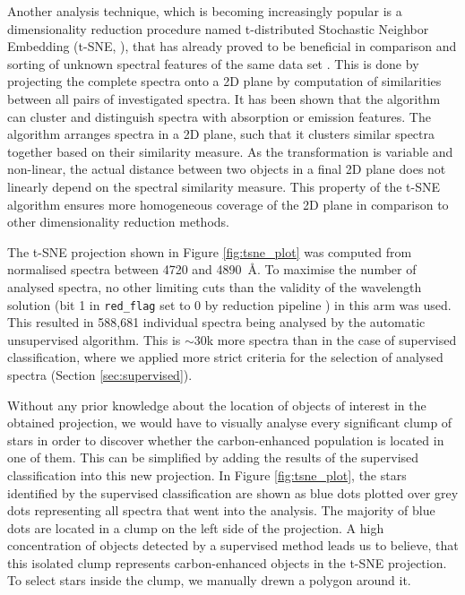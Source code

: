 Another analysis technique, which is becoming increasingly popular is a dimensionality reduction procedure named t-distributed Stochastic Neighbor Embedding (t-SNE, \cite{van2008visualizing}), that has already proved to be beneficial in comparison and sorting of unknown spectral features of the same data set \citep{2017ApJS..228...24T}. This is done by projecting the complete spectra onto a 2D plane by computation of similarities between all pairs of investigated spectra. It has been shown that the algorithm can cluster and distinguish spectra with absorption or emission features. The algorithm arranges spectra in a 2D plane, such that it clusters similar spectra together based on their similarity measure. As the transformation is variable and non-linear, the actual distance between two objects in a final 2D plane does not linearly depend on the spectral similarity measure. This property of the t-SNE algorithm ensures more homogeneous coverage of the 2D plane in comparison to other dimensionality reduction methods.

The t-SNE projection shown in Figure \ref{fig:tsne_plot} was computed from normalised spectra between 4720 and 4890~\AA. To maximise the number of analysed spectra, no other limiting cuts than the validity of the wavelength solution (bit 1 in \texttt{red\_flag} set to 0 by reduction pipeline \cite{2017MNRAS.464.1259K}) in this arm was used. This resulted in 588,681 individual spectra being analysed by the automatic unsupervised algorithm. This is $\sim30$k more spectra than in the case of supervised classification, where we applied more strict criteria for the selection of analysed spectra (Section \ref{sec:supervised}). 

Without any prior knowledge about the location of objects of interest in the obtained projection, we would have to visually analyse every significant clump of stars in order to discover whether the carbon-enhanced population is located in one of them. This can be simplified by adding the results of the supervised classification into this new projection. In Figure \ref{fig:tsne_plot}, the stars identified by the supervised classification are shown as blue dots plotted over grey dots representing all spectra that went into the analysis. The majority of blue dots are located in a clump on the left side of the projection. A high concentration of objects detected by a supervised method leads us to believe, that this isolated clump represents carbon-enhanced objects in the t-SNE projection. To select stars inside the clump, we manually drewn a polygon around it.

